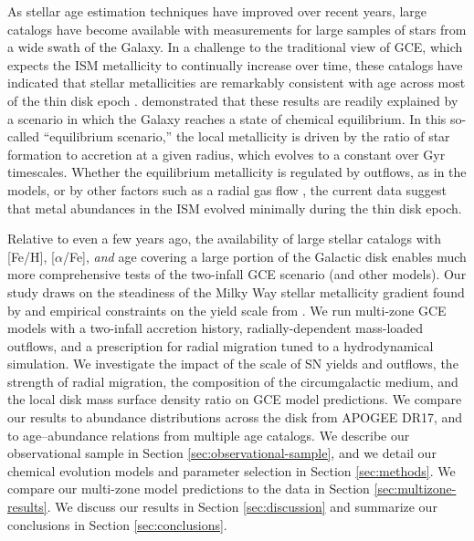 \documentclass[twocolumn,twocolappendix,linenumbers]{aastex631}
\newcommand{\todo}[1]{{\color{red}#1}}
\newcommand{\aFe}{[$\alpha$/Fe]\xspace}
\newcommand{\Gyr}{\,{\rm Gyr}}
\begin{document}
As stellar age estimation techniques have improved over recent years, large catalogs have become available with measurements for large samples of stars from a wide swath of the Galaxy. In a challenge to the traditional view of GCE, which expects the ISM metallicity to continually increase over time, 
these catalogs have indicated that stellar metallicities are remarkably consistent with age across most of the thin disk epoch \citep[e.g.,][]{spina_mapping_2022,magrini_gaia-eso_2023,willett_evolution_2023,carbajo-hijarrubia_occaso_2024,gallart_chronology_2024}. \citet{johnson_milky_2024} demonstrated that these results are readily explained by a scenario in which the Galaxy reaches a state of chemical equilibrium. In this so-called ``equilibrium scenario,'' the local metallicity is driven by the ratio of star formation to accretion at a given radius, which evolves to a constant over Gyr timescales. Whether the equilibrium metallicity is regulated by outflows, as in the  \citet{johnson_milky_2024} models, or by other factors such as a radial gas flow \citep{spitoni_effects_2011,bilitewski_radial_2012,sharda_interplay_2024}, the current data suggest that metal abundances in the ISM evolved minimally during the thin disk epoch.

Relative to even a few years ago, the availability of large stellar catalogs with [Fe/H], \aFe, {\it and} age covering a large portion of the Galactic disk enables much more comprehensive tests of the two-infall GCE scenario (and other models). Our study draws on the steadiness of the Milky Way stellar metallicity gradient found by \citet{johnson_milky_2024} and empirical constraints on the yield scale from \citet{weinberg_scale_2024}.
We run multi-zone GCE models with a two-infall accretion history, radially-dependent mass-loaded outflows, and a prescription for radial migration tuned to a hydrodynamical simulation. We investigate the impact of the scale of SN yields and outflows, the strength of radial migration, the composition of the circumgalactic medium, and the local disk mass surface density ratio on GCE model predictions. We compare our results to abundance distributions across the disk from APOGEE DR17, and to age--abundance relations from multiple age catalogs. We describe our observational sample in Section \ref{sec:observational-sample}, and we detail our chemical evolution models and parameter selection in Section \ref{sec:methods}. We compare our multi-zone model predictions to the data in Section \ref{sec:multizone-results}. We discuss our results in Section \ref{sec:discussion} and summarize our conclusions in Section \ref{sec:conclusions}.
\end{document}
